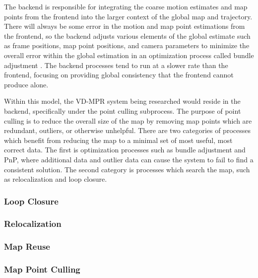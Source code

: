 The backend is responsible for integrating the coarse motion estimates and map points from the frontend into the larger context of the global map and trajectory. There will always be some error in the motion and map point estimations from the frontend, so the backend adjusts various elements of the global estimate such as frame positions, map point positions, and camera parameters to minimize the overall error within the global estimation in an optimization process called bundle adjustment \cite{triggsBundleAdjustmentModern2000a}. The backend processes tend to run at a slower rate than the frontend, focusing on providing global consistency that the frontend cannot produce alone.

Within this model, the VD-MPR system being researched would reside in the backend, specifically under the point culling subprocess. The purpose of point culling is to reduce the overall size of the map by removing map points which are redundant, outliers, or otherwise unhelpful. There are two categories of processes which benefit from reducing the map to a minimal set of most useful, most correct data. The first is optimization processes such as bundle adjustment and PnP, where additional data and outlier data can cause the system to fail to find a consistent solution. The second category is processes which search the map, such as relocalization and loop closure.

\subsubsection{Loop Closure}
\subsubsection{Relocalization}
\subsubsection{Map Reuse}
\subsubsection{Map Point Culling}
